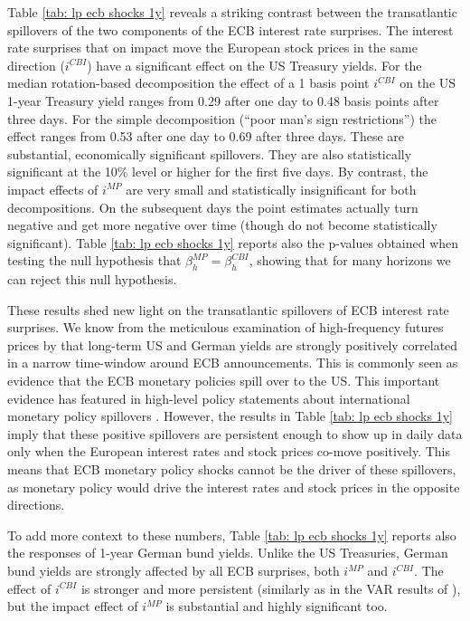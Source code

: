 \documentclass[a4paper,12pt]{article}
\begin{document}
Table \ref{tab: lp ecb shocks 1y} reveals a striking contrast between the transatlantic spillovers
of the two components of the ECB interest rate surprises.
The interest rate surprises
that on impact move the European stock prices in the same direction ($i^{CBI}$) have a significant effect
on the US Treasury yields. 
For the median rotation-based decomposition the effect of a 1 basis point $i^{CBI}$ on the US 1-year Treasury yield
ranges from 0.29 after one day to 0.48 basis points after three days. 
For the simple decomposition (``poor man's sign restrictions'') the effect ranges from 0.53 after one day to 0.69 after three days.
These are substantial, economically significant spillovers. They are also statistically significant at the 10\% level or higher for the first five days.
By contrast, the impact effects of $i^{MP}$ are very small and statistically insignificant for both decompositions. On the subsequent days the point estimates actually turn negative and get more negative over time (though do not become statistically significant).
Table \ref{tab: lp ecb shocks 1y} reports also the p-values obtained when testing
the null hypothesis that $\beta^{MP}_h=\beta^{CBI}_h$, showing that for many horizons we can
reject this null hypothesis.

These results shed new light on the transatlantic spillovers of ECB interest rate surprises.
We know from the meticulous examination of high-frequency futures prices by \cite{Curcuru_etal_2018} that long-term US and German yields are strongly positively correlated in a narrow time-window around ECB announcements. 
This is commonly seen as evidence that the ECB monetary policies spill over to the US.
This important evidence has featured
in high-level policy statements about international monetary policy spillovers \citep{Powell_2018,Clarida_2021}. 
However, the results in Table \ref{tab: lp ecb shocks 1y} imply that these positive spillovers
are persistent enough to show up in daily data only when the European interest rates and stock prices co-move positively.
This means that ECB monetary policy shocks cannot be the driver of these spillovers, as monetary
policy would drive the interest rates and stock prices in the opposite directions.

To add more context to these numbers, Table \ref{tab: lp ecb shocks 1y}  reports also the responses of 1-year German bund yields. Unlike the US Treasuries, German bund yields are strongly affected by all ECB surprises,
both $i^{MP}$ and $i^{CBI}$.
The effect of $i^{CBI}$ is stronger and more persistent (similarly as in the VAR results of \citealp{Jarocinski_Karadi_2020}), but the impact effect of $i^{MP}$ is substantial and highly significant too. 
\end{document}
